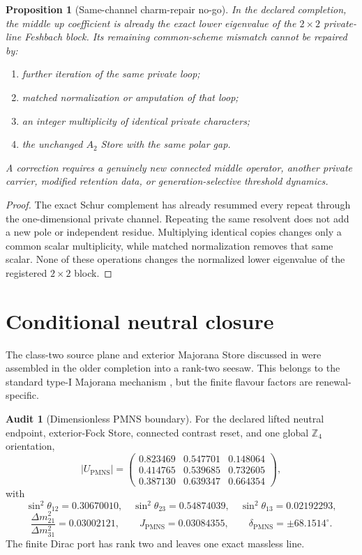 \documentclass[11pt,oneside,openany]{book}
\numberwithin{equation}{chapter}
\newtheorem{proposition}[theorem]{Proposition}
\theoremstyle{definition}
\newtheorem{audit}[theorem]{Audit}
\theoremstyle{remark}
\newcommand{\Zfour}{\mathbb Z_4}
\newcommand{\PMNS}{\mathrm{PMNS}}
\begin{document}
\begin{proposition}[Same-channel charm-repair no-go]
\label{prop:charm-rigidity}
In the declared completion, the middle up coefficient is already the exact
lower eigenvalue of the \(2\times2\) private-line Feshbach block.  Its
remaining common-scheme mismatch cannot be repaired by:
\begin{enumerate}[label=\textup{(\roman*)},leftmargin=2.2em]
\item further iteration of the same private loop;
\item matched normalization or amputation of that loop;
\item an integer multiplicity of identical private characters;
\item the unchanged \(A_2\) Store with the same polar gap.
\end{enumerate}
A correction requires a genuinely new connected middle operator, another
private carrier, modified retention data, or generation-selective threshold
dynamics.
\end{proposition}

\begin{proof}
The exact Schur complement has already resummed every repeat through the
one-dimensional private channel.  Repeating the same resolvent does not add
a new pole or independent residue.  Multiplying identical copies changes
only a common scalar multiplicity, while matched normalization removes that
same scalar.  None of these operations changes the normalized lower
eigenvalue of the registered \(2\times2\) block.
\end{proof}

\section{Conditional neutral closure}

The class-two source plane and exterior Majorana Store discussed in
 were assembled in the older completion into a rank-two
seesaw.  This belongs to the standard type-I Majorana mechanism
\cite{Minkowski1977,MohapatraSenjanovic1980}, but the finite flavour factors
are renewal-specific.

\begin{audit}[Dimensionless PMNS boundary]
\label{audit:conditional-pmns}
For the declared lifted neutral endpoint, exterior-Fock Store, connected
contrast reset, and one global \(\Zfour\) orientation,
\[
 |U_{\PMNS}|
 =
 \begin{pmatrix}
 0.823469&0.547701&0.148064\\
 0.414765&0.539685&0.732605\\
 0.387130&0.639347&0.664354
 \end{pmatrix},
\]
with
\[
 \sin^2\theta_{12}=0.30670010,\quad
 \sin^2\theta_{23}=0.54874039,\quad
 \sin^2\theta_{13}=0.02192293,
\]
\[
 \frac{\Delta m_{21}^2}{\Delta m_{31}^2}=0.03002121,
 \qquad
 J_{\PMNS}=0.03084355,
 \qquad
 \delta_{\PMNS}=\pm68.1514^\circ.
\]
The finite Dirac port has rank two and leaves one exact massless line.
\end{audit}
\end{document}
